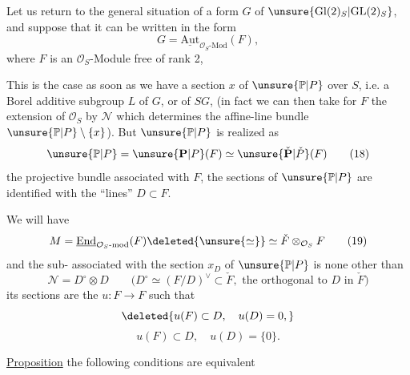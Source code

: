 

Let us return to the general situation of a form $G$ of $\unsure{\mathrm{Gl}(2)_S|\mathrm{GL}(2)_S}$, and suppose that it can be written in the form
\[
G=\underline{\mathrm{Aut}}_{\mathcal O_S\text{-Mod}}(F), \tag{17}
\]
where $F$ is an $\mathcal O_S$-Module  free of rank 2,

This is the case as soon as we have a section $x$ of $\unsure{\mathbb P|P}$ over $S$, i.e. a Borel additive subgroup $L$ of $G$, or of $SG$, (in fact we can then take for $F$ the extension of $\mathcal O_S$ by $\mathcal N$ which determines the affine-line bundle $\unsure{\mathbb P|P}\setminus\{x\}$). But  $\unsure{\mathbb P|P}$ is realized as 
\[
\unsure{\mathbb P|P}=\unsure{\mathbf P|P}(F)\simeq\unsure{\check{\mathbf P}|\check P}(F) \tag{18}
\]
the projective bundle associated with $F$,   the sections of $\unsure{\mathbb P|P}$ are identified with the ``lines'' $D\subset F$.

We will have
\[
M=\underline{\mathrm{End}}_{\mathcal O_S\text{-mod}}(F)\deleted{\unsure{\simeq}}\simeq\check F\otimes_{\mathcal O_S}F \tag{19}
\]
and the sub-  associated with the section $x_D$ of $\unsure{\mathbb P|P}$  is none other than 
\[
\mathcal N=D^\circ\otimes D
\qquad\bigl(D^\circ\simeq(F/D)^\vee\subset\check F,\text{ the orthogonal to }D\text{ in }\check F\bigr) \tag{20}
\]
its sections are the $u:F\longrightarrow F$ such that
\[
\deleted{u(F)\subset D,\quad u(D)=0,}
\]
\[
u(F)\subset D,\quad u(D)=\{0\}. \tag{21}
\]


\uline{Proposition}   the following conditions are equivalent

